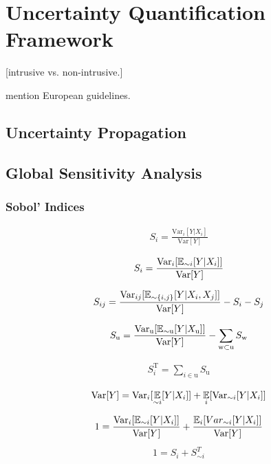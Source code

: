 \newpage

\section{Uncertainty Quantification Framework}
\thispagestyle{plain} %

[intrusive vs. non-intrusive.]

mention European guidelines.
\subsection{Uncertainty Propagation}

\subsection{Global Sensitivity Analysis}

\subsubsection{Sobol' Indices}

\begin{align}
S_i = \frac{\text{Var}_i[Y|X_i ]}{\text{Var}[Y]}
\end{align}

\begin{align}
S_i = \frac{\text{Var}_i[\operatorname*{\mathbb{E}}_{\sim i}[Y|X_i ]]}{\text{Var}[Y]}
\end{align}

\begin{align}
S_{ij} = \frac{\text{Var}_{ij}[\operatorname*{\mathbb{E}}_{\sim \{i,j\}}[Y|X_i, X_j ]]}{\text{Var}[Y]} - S_i - S_j
\end{align}

\begin{align}
S_\text{u} = \frac{\text{Var}_\text{u}[\operatorname*{\mathbb{E}}_{\sim \text{u}}[Y|X_\text{u} ]]}{\text{Var}[Y]} - \sum_{\text{w} \subset \text{u}} S_\text{w}
\end{align}

\begin{align}
S_i^\text{T} = \sum_{i \in \text{u}} S_\text{u}
\end{align}

\begin{align}
\text{Var}[Y] = \text{Var}_i[\operatorname*{\mathbb{E}}_{\sim i}[Y|X_i]] + \operatorname*{\mathbb{E}}_{i}[\text{Var}_{\sim i}[Y|X_i]]
\end{align}

\begin{align}
1 = \frac{\text{Var}_i[\operatorname*{\mathbb{E}}_{\sim i}[Y|X_i]]}{\text{Var}[Y]} + \frac{\operatorname*{\mathbb{E}}_{i}[Var_{\sim i}[Y|X_i]]}{\text{Var}[Y]}
\end{align}
\begin{align}
1 = S_i + S_{\sim i}^T
\end{align}

